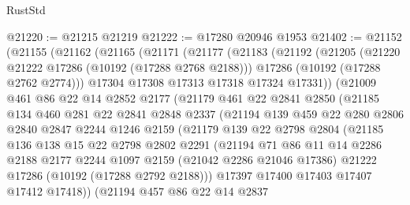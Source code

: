 \begin{lexlean}{RustStd}
\begin{coremodule}
@21220 := @21215 @21219
@21222 := @17280 @20946 @1953
@21402 := @21152
    (@21155
      (@21162
        (@21165
          (@21171
            (@21177
              (@21183
                (@21192
                  (@21205
                    (@21220 @21222 @17286 (@10192 (@17288 @2768 @2188)))
                    @17286
                    (@10192 (@17288 @2762 @2774)))
                  @17304
                  @17308
                  @17313
                  @17318
                  @17324
                  @17331))
              (@21009
                @461
                @86
                @22
                @14
                @2852
                @2177
                (@21179
                  @461
                  @22
                  @2841
                  @2850
                  (@21185
                    @134
                    @460
                    @281
                    @22
                    @2841
                    @2848
                    @2337
                    (@21194
                      @139
                      @459
                      @22
                      @280
                      @2806
                      @2840
                      @2847
                      @2244
                      @1246
                      @2159
                      (@21179
                        @139
                        @22
                        @2798
                        @2804
                        (@21185
                          @136
                          @138
                          @15
                          @22
                          @2798
                          @2802
                          @2291
                          (@21194
                            @71
                            @86
                            @11
                            @14
                            @2286
                            @2188
                            @2177
                            @2244
                            @1097
                            @2159
                            (@21042 @2286 @21046 @17386)
                            @21222
                            @17286
                            (@10192 (@17288 @2792 @2188)))
                          @17397
                          @17400
                          @17403
                          @17407
                          @17412
                          @17418))
                      (@21194
                        @457
                        @86
                        @22
                        @14
                        @2837

\end{coremodule}
\end{lexlean}
